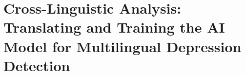 \chapter{Cross-Linguistic Analysis: Translating and Training the AI Model for Multilingual Depression Detection}
\label{chap:ch3}


